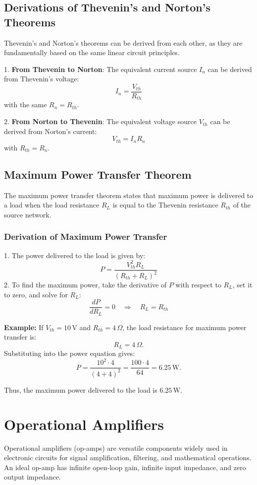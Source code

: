 \documentclass[openany]{book}
\begin{document}
\section{Derivations of Thevenin's and Norton's Theorems}
Thevenin's and Norton's theorems can be derived from each other, as they are fundamentally based on the same linear circuit principles.

1. \textbf{From Thevenin to Norton}: The equivalent current source \(I_n\) can be derived from Thevenin's voltage:
   \[
   I_n = \frac{V_{th}}{R_{th}}
   \]
   with the same \(R_n = R_{th}\).

2. \textbf{From Norton to Thevenin}: The equivalent voltage source \(V_{th}\) can be derived from Norton's current:
   \[
   V_{th} = I_n R_n
   \]
   with \(R_{th} = R_n\).

\section{Maximum Power Transfer Theorem}
The maximum power transfer theorem states that maximum power is delivered to a load when the load resistance \(R_L\) is equal to the Thevenin resistance \(R_{th}\) of the source network.

\subsection{Derivation of Maximum Power Transfer}
1. The power delivered to the load is given by:
   \[
   P = \frac{V_{th}^2 R_L}{(R_{th} + R_L)^2}
   \]
2. To find the maximum power, take the derivative of \(P\) with respect to \(R_L\), set it to zero, and solve for \(R_L\):
   \[
   \frac{dP}{dR_L} = 0 \quad \Rightarrow \quad R_L = R_{th}
   \]

\textbf{Example:} If \(V_{th} = 10 \, \text{V}\) and \(R_{th} = 4 \, \Omega\), the load resistance for maximum power transfer is:
\[
R_L = 4 \, \Omega.
\]
Substituting into the power equation gives:
\[
P = \frac{10^2 \cdot 4}{(4 + 4)^2} = \frac{100 \cdot 4}{64} = 6.25 \, \text{W}.
\]

Thus, the maximum power delivered to the load is \(6.25 \, \text{W}\).

\chapter{Operational Amplifiers}
Operational amplifiers (op-amps) are versatile components widely used in electronic circuits for signal amplification, filtering, and mathematical operations. An ideal op-amp has infinite open-loop gain, infinite input impedance, and zero output impedance.
\end{document}
